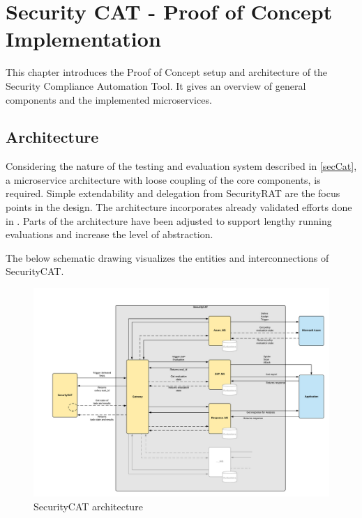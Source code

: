\addchapheadtotoc
\chapter{Security CAT - Proof of Concept Implementation}

This chapter introduces the Proof of Concept setup and architecture of the Security Compliance Automation Tool. It gives an overview of general components and the implemented microservices. 

\section{Architecture}
\label{architecture}
Considering the nature of the testing and evaluation system described in \ref{secCat}, a microservice architecture with loose coupling of the core components, is required. Simple extendability and delegation from SecurityRAT are the focus points in the design.
The architecture incorporates already validated efforts done in \citep{secCat2020}. Parts of the architecture have been adjusted to support lengthy running evaluations and increase the level of abstraction.

The below schematic drawing visualizes the entities and interconnections of SecurityCAT.

\newpage

\begin{figure}[ht!]
\begin{center}
\includegraphics[width=17cm]{SecurityCAT_Architecture.png}
\end{center}
\caption[SecurityCAT architecture]{SecurityCAT architecture}
\end{figure}

